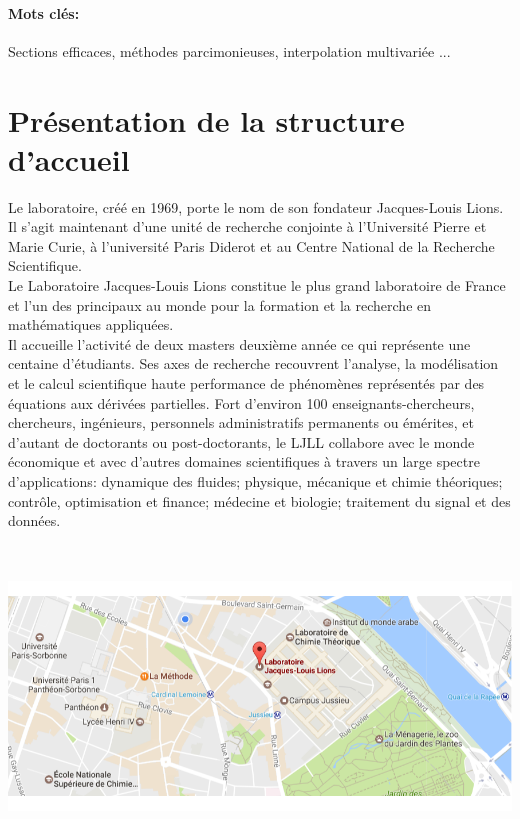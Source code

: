 \paragraph{Mots clés:} Sections efficaces, méthodes parcimonieuses, interpolation multivariée ...

\newpage
\section{Présentation de la structure d’accueil}\label{sec:2}
\hspace{0.5cm}
Le laboratoire, créé en 1969, porte le nom de son fondateur Jacques-Louis Lions.
Il s’agit maintenant d’une unité de recherche conjointe à l’Université Pierre et Marie Curie,
à l’université Paris Diderot et au Centre National de la Recherche Scientifique. \\

Le Laboratoire Jacques-Louis Lions constitue le plus grand laboratoire de France et l’un
des principaux au monde pour la formation et la recherche en mathématiques appliquées. \\

Il accueille l’activité de deux masters deuxième année ce qui représente une centaine d’étudiants.
Ses axes de recherche recouvrent l’analyse, la modélisation et le calcul scientifique haute
performance de phénomènes représentés par des équations aux dérivées partielles.
Fort d’environ 100 enseignants-chercheurs, chercheurs, ingénieurs, personnels administratifs
permanents ou émérites, et d’autant de doctorants ou post-doctorants, le LJLL collabore avec
le monde économique et avec d’autres domaines scientifiques à travers un large spectre
d’applications: dynamique des fluides; physique, mécanique et chimie théoriques; contrôle,
optimisation et finance; médecine et biologie; traitement du signal et des données.
\begin{center}
\includegraphics[height=8cm,width=0.9\linewidth]{images/Localisation.png}
\end{center}

